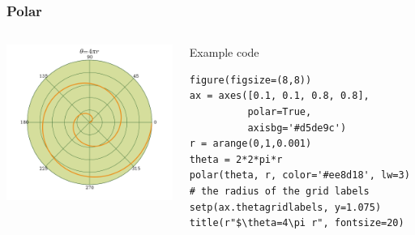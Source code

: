 \documentclass[14pt,compress]{beamer}
\begin{document}
\begin{frame}[fragile] \frametitle{Polar}
  \begin{columns}
    \hspace*{-0.5in}
  \includegraphics[height=2in, interpolate=true]{data/polar}  
    \begin{block}{Example code}
    \tiny
\begin{lstlisting}
figure(figsize=(8,8))
ax = axes([0.1, 0.1, 0.8, 0.8], 
          polar=True, 
          axisbg='#d5de9c')
r = arange(0,1,0.001)
theta = 2*2*pi*r
polar(theta, r, color='#ee8d18', lw=3)
# the radius of the grid labels
setp(ax.thetagridlabels, y=1.075) 
title(r"$\theta=4\pi r", fontsize=20)
\end{lstlisting}
  \end{block}
\end{columns}
\end{frame}
\end{document}
